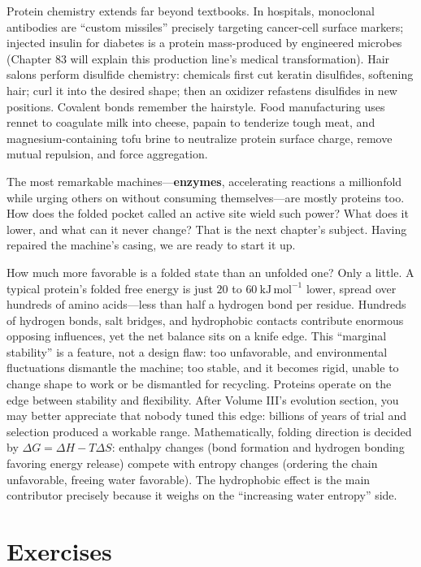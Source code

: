 Protein chemistry extends far beyond textbooks. In hospitals, monoclonal antibodies are ``custom missiles'' precisely targeting cancer-cell surface markers; injected insulin for diabetes is a protein mass-produced by engineered microbes (Chapter 83 will explain this production line's medical transformation). Hair salons perform disulfide chemistry: chemicals first cut keratin disulfides, softening hair; curl it into the desired shape; then an oxidizer refastens disulfides in new positions. Covalent bonds remember the hairstyle. Food manufacturing uses rennet to coagulate milk into cheese, papain to tenderize tough meat, and magnesium-containing tofu brine to neutralize protein surface charge, remove mutual repulsion, and force aggregation.

The most remarkable machines---\textbf{enzymes}, accelerating reactions a millionfold while urging others on without consuming themselves---are mostly proteins too. How does the folded pocket called an active site wield such power? What does it lower, and what can it never change? That is the next chapter's subject. Having repaired the machine's casing, we are ready to start it up.

\begin{tiaozhan}
How much more favorable is a folded state than an unfolded one? Only a little. A typical protein's folded free energy is just $20$ to $60\ \mathrm{kJ\,mol^{-1}}$ lower, spread over hundreds of amino acids---less than half a hydrogen bond per residue. Hundreds of hydrogen bonds, salt bridges, and hydrophobic contacts contribute enormous opposing influences, yet the net balance sits on a knife edge. This ``marginal stability'' is a feature, not a design flaw: too unfavorable, and environmental fluctuations dismantle the machine; too stable, and it becomes rigid, unable to change shape to work or be dismantled for recycling. Proteins operate on the edge between stability and flexibility. After Volume III's evolution section, you may better appreciate that nobody tuned this edge: billions of years of trial and selection produced a workable range. Mathematically, folding direction is decided by $\Delta G=\Delta H-T\Delta S$: enthalpy changes (bond formation and hydrogen bonding favoring energy release) compete with entropy changes (ordering the chain unfavorable, freeing water favorable). The hydrophobic effect is the main contributor precisely because it weighs on the ``increasing water entropy'' side.
\end{tiaozhan}

\section*{Exercises}

